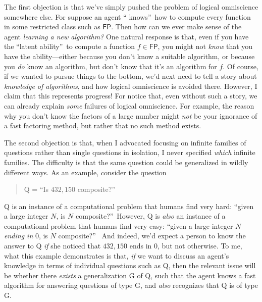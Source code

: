 \documentclass[12pt,onecolumn]{article}%
\begin{document}
The first objection is that we've simply pushed the problem of logical
omniscience somewhere else. For suppose an agent \textquotedblleft
knows\textquotedblright\  how to compute every function in some restricted
class such as $\mathsf{FP}$. Then how can we ever make sense of the agent
\textit{learning a new algorithm?} One natural response is that, even if
you have the \textquotedblleft latent ability\textquotedblright\  to compute a
function $f\in\mathsf{FP}$, you might not \textit{know} that you have the
ability---either because you don't know a suitable algorithm, or because you
\textit{do} know an algorithm, but don't know that it's an algorithm for $f$.
 Of course, if we wanted to pursue things to the bottom, we'd next need to
tell a story about \textit{knowledge of algorithms}, and how logical
omniscience is avoided there. However, I claim that this represents
progress! For notice that, even without such a story, we can already explain
\textit{some} failures of logical omniscience. For example, the reason why
you don't know the factors of a large number might \textit{not} be your
ignorance of a fast factoring method, but rather that no such method exists.

The second objection is that, when I advocated focusing on infinite families
of questions rather than single questions in isolation, I never specified
\textit{which} infinite families. The difficulty is that the same question
could be generalized in wildly different ways. As an example, consider the question

\begin{quotation}
\noindent Q = \textquotedblleft Is $432,150$ composite?\textquotedblright\ 
\end{quotation}

\noindent Q is an instance of a computational problem that humans find very
hard: \textquotedblleft given a large integer $N$, is $N$
composite?\textquotedblright\  However, Q is \textit{also} an instance of a
computational problem that humans find very easy: \textquotedblleft given a
large integer $N$ \textit{ending in} $0$, is $N$ composite?\textquotedblright\ %
 And indeed, we'd expect a person to know the answer to Q \textit{if} she
noticed that $432,150$ ends in $0$, but not otherwise. To me, what this
example demonstrates is that, \textit{if} we want to discuss an agent's
knowledge in terms of individual questions such as Q, then the relevant issue
will be whether there \textit{exists} a generalization G of Q, such that the
agent knows a fast algorithm for answering questions of type G, and
\textit{also} recognizes that Q is of type G.
\end{document}
